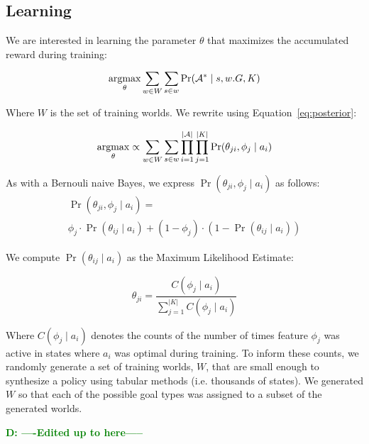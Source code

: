 \documentclass[conference]{IEEEtran}
\newcommand{\dnote}[1]{\textcolor{Green}{\textbf{D: #1}}}
\newcommand{\argmax}{\operatornamewithlimits{argmax}}
\begin{document}
\subsection{Learning}

We are interested in learning the parameter $\theta$ that maximizes the accumulated reward
during training:

\begin{equation}
\argmax_\theta \sum_{w \in W} \sum_{s \in w} \Pr(\mathcal{A}^* \mid s, w.G, K)
\end{equation}

Where $W$ is the set of training worlds. We rewrite using Equation~\ref{eq:posterior}:
 
\begin{equation}
\argmax_\theta \propto \sum_{w \in W} \sum_{s \in w} \prod_{i=1}^{|\mathcal{A}|} \prod_{j=1}^{|K|} \Pr(\theta_{ji}, \phi_j \mid a_i)
\end{equation}

As with a Bernouli naive Bayes, we express $\Pr(\theta_{ji}, \phi_j \mid a_i)$ as follows:
\begin{multline}
\Pr(\theta_{ji}, \phi_j \mid a_i) = \\
\phi_j \cdot \Pr(\theta_{ij} \mid a_i) + (1 - \phi_j) \cdot (1 - \Pr(\theta_{ij} \mid a_i))
\end{multline}

We compute $\Pr(\theta_{ij}\mid a_i)$ as the Maximum Likelihood Estimate:

\begin{equation}
\theta_{ji} = \frac{C(\phi_j \mid a_i)}{\sum \limits_{j=1}^{|K|} C(\phi_j \mid a_i)}
\end{equation}

Where $C(\phi_j \mid a_i)$ denotes the counts of the number of times feature $\phi_j$ was active
in states where $a_i$ was optimal during training. To inform these counts, we randomly generate a
set of training worlds, $W$, that are small enough to synthesize a policy using tabular methods
(i.e. thousands of states). We generated $W$ so that each of the possible goal types was assigned to a subset
of the generated worlds.

\dnote{----Edited up to here-----}
\end{document}
